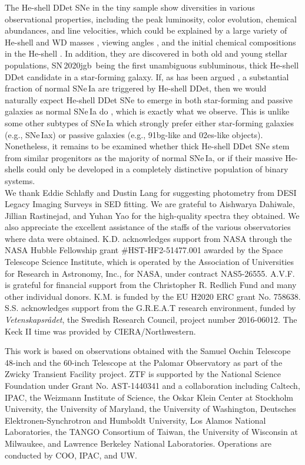 \documentclass[twocolumn]{aastex631}
\newcommand{\sn}{SN\,2020jgb}
\begin{document}
The He-shell DDet SNe in the tiny sample show diversities in various observational properties, including the peak luminosity, color evolution, chemical abundances, and line velocities, which could be explained by a large variety of He-shell and WD masses \citep{polin_observational_2019,Shen_2D_2021}, viewing angles \citep{Shen_2D_2021}, and the initial chemical compositions in the He-shell \citep{Kromer_DD_2010}. In addition, they are discovered in both old and young stellar populations, \sn\ being the first unambiguous subluminous, thick He-shell DDet candidate in a star-forming galaxy. If, as has been argued \citep[e.g.,][]{Sanders_2021, Eitner_2022}, a substantial fraction of normal SNe\,Ia are triggered by He-shell DDet, then we would naturally expect He-shell DDet SNe to emerge in both star-forming and passive galaxies as normal SNe\,Ia do \citep[e.g.,][]{Sullivan_2006,Smith_2012}, which is exactly what we observe. This is unlike some other subtypes of SNe\,Ia \citep{Jha_2019} which strongly prefer either star-forming galaxies (e.g., SNe\,Iax) or passive galaxies (e.g., 91bg-like and 02es-like objects). Nonetheless, it remains to be examined whether thick He-shell DDet SNe stem from similar progenitors as the majority of normal SNe\,Ia, or if their massive He-shells could only be developed in a completely distinctive population of binary systems.\\

\noindent We thank Eddie Schlafly and Dustin Lang for suggesting photometry from DESI Legacy Imaging Surveys in SED fitting. We are grateful to Aishwarya Dahiwale, Jillian Rastinejad, and Yuhan Yao for the high-quality spectra they obtained. We also appreciate the excellent assistance of the staffs of the various observatories where data were obtained. K.D. acknowledges support from NASA through the NASA Hubble Fellowship grant \#HST-HF2-51477.001 awarded by the Space Telescope Science Institute, which is operated by the Association of Universities for Research in Astronomy, Inc., for NASA, under contract NAS5-26555. A.V.F. is grateful for financial support from the Christopher R. Redlich Fund and many other individual donors. K.M. is funded by the EU H2020 ERC grant No. 758638. S.S. acknowledges support from the G.R.E.A.T research environment, funded by {\em Vetenskapsr\aa det}, the Swedish Research Council, project number 2016-06012. The Keck II time was provided by CIERA/Northwestern.

This work is based on observations obtained with the Samuel Oschin Telescope 48-inch and the 60-inch Telescope at the Palomar Observatory as part of the Zwicky Transient Facility project. ZTF is supported by the National Science Foundation under Grant No. AST-1440341 and a collaboration including Caltech, IPAC, the Weizmann Institute of Science, the Oskar Klein Center at Stockholm University, the University of Maryland, the University of Washington, Deutsches Elektronen-Synchrotron and Humboldt University, Los Alamos National Laboratories, the TANGO Consortium of Taiwan, the University of Wisconsin at Milwaukee, and Lawrence Berkeley National Laboratories. Operations are conducted by COO, IPAC, and UW. 
\end{document}
